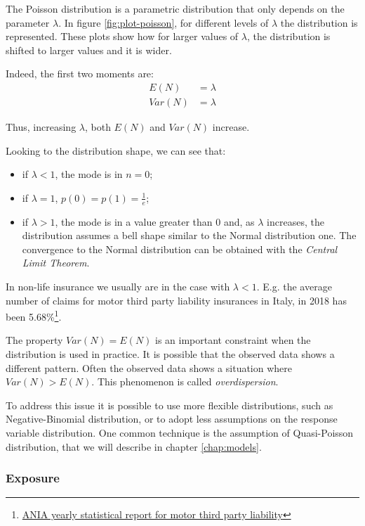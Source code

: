 \documentclass[a4paper, nobind]{templates/ociamthesis}
\providecommand{\tightlist}{%
  \setlength{\itemsep}{0pt}\setlength{\parskip}{0pt}}
\theoremstyle{definition}
\theoremstyle{definition}
\theoremstyle{definition}
\theoremstyle{remark}
\begin{document}
The Poisson distribution is a parametric distribution that only depends on the parameter \(\lambda\). In figure \ref{fig:plot-poisson}, for different levels of \(\lambda\) the distribution is represented. These plots show how for larger values of \(\lambda\), the distribution is shifted to larger values and it is wider.

Indeed, the first two moments are:
\begin{align*}
E(N)   & = \lambda \\
Var(N) & = \lambda
\end{align*}

Thus, increasing \(\lambda\), both \(E(N)\) and \(Var(N)\) increase.

Looking to the distribution shape, we can see that:

\begin{itemize}
\tightlist
\item
  if \(\lambda<1\), the mode is in \(n=0\);
\item
  if \(\lambda=1\), \(p(0)=p(1)=\frac{1}{e}\);
\item
  if \(\lambda>1\), the mode is in a value greater than \(0\) and, as \(\lambda\) increases, the distribution assumes a bell shape similar to the Normal distribution one. The convergence to the Normal distribution can be obtained with the \emph{Central Limit Theorem}.
\end{itemize}

In non-life insurance we usually are in the case with \(\lambda<1\). E.g. the average number of claims for motor third party liability insurances in Italy, in 2018 has been 5.68\%\footnote{\href{https://www.ania.it/ricerca-avanzata/-/asset_publisher/XIyLeujL9irt/content/id/113283}{ANIA yearly statistical report for motor third party liability}}.

The property \(Var(N) = E(N)\) is an important constraint when the distribution is used in practice. It is possible that the observed data shows a different pattern. Often the observed data shows a situation where \(Var(N) > E(N)\). This phenomenon is called \emph{overdispersion}.

To address this issue it is possible to use more flexible distributions, such as Negative-Binomial distribution, or to adopt less assumptions on the response variable distribution. One common technique is the assumption of Quasi-Poisson distribution, that we will describe in chapter \ref{chap:models}.

\hypertarget{chap:exposure}{%
\subsubsection{Exposure}\label{chap:exposure}}
\end{document}
